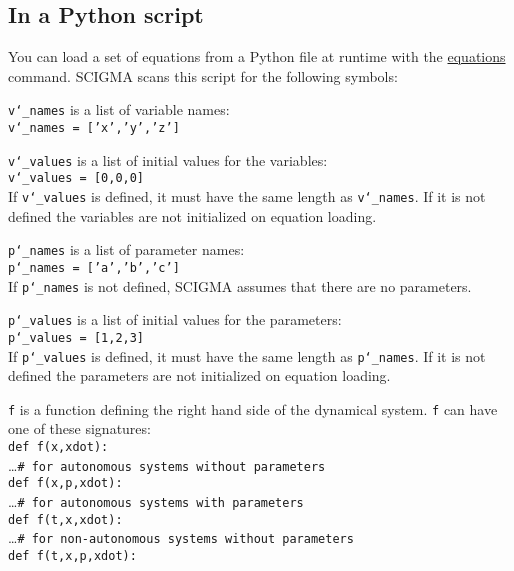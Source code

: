 \documentclass[10pt,a4paper,titlepage]{article}
\newcommand{\HL}[1]{\hyperlink{#1}{#1}}
\newcommand{\T}[1]{\texttt{#1}}
\begin{document}
\subsection{In a Python script}
\label{sec::pythoneq}
You can load a set of equations from a Python file at runtime with the \HL{equations} command. SCIGMA scans this script for the following symbols:
\begin{description}
\item{\T{v\char`_names}} is a list of variable names:\\
\T{v\char`_names = ['x','y','z']}
\item{\T{v\char`_values}} is a list of initial values for the variables:\\
\T{v\char`_values = [0,0,0]}\\
If \T{v\char`_values} is defined, it must have the same length as \T{v\char`_names}. If it is not defined the variables are not initialized on equation loading.
\item{\T{p\char`_names}} is a list of parameter names:\\
\T{p\char`_names = ['a','b','c']}\\
If \T{p\char`_names} is not defined, SCIGMA assumes that there are no parameters.
\item{\T{p\char`_values}} is a list of initial values for the parameters:\\
\T{p\char`_values = [1,2,3]}\\
If \T{p\char`_values} is defined, it must have the same length as \T{p\char`_names}. If it is not defined the parameters are not initialized on equation loading.
\item{\T{f}} is a function defining the right hand side of the dynamical system. \T{f} can have one of these signatures:\\
\T{def f(x,xdot):}\\
\hphantom{mmm}\ldots\hspace{8em}\T{\# for autonomous systems without parameters}\\
\T{def f(x,p,xdot):}\\
\hphantom{mmm}\ldots\hspace{8em}\T{\# for autonomous systems with parameters}\\
\T{def f(t,x,xdot):}\\
\hphantom{mmm}\ldots\hspace{8em}\T{\# for non-autonomous systems without parameters}\\
\T{def f(t,x,p,xdot):}\\

\end{description}
\end{document}
